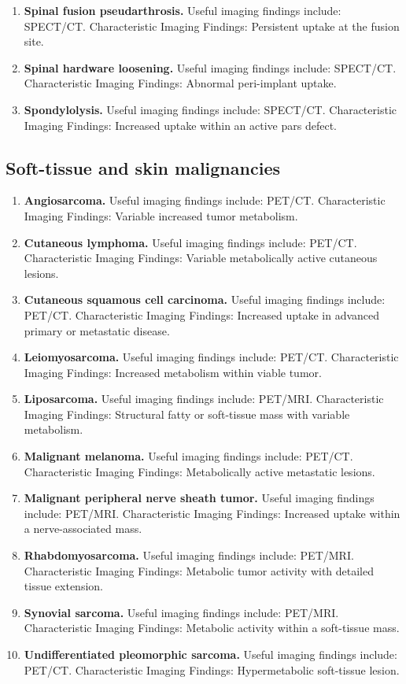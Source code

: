 \begin{enumerate}[leftmargin=*,itemsep=0.45em,topsep=0.4em]
\item \textbf{Spinal fusion pseudarthrosis.} Useful imaging findings include: SPECT/CT. Characteristic Imaging Findings: Persistent uptake at the fusion site.
\item \textbf{Spinal hardware loosening.} Useful imaging findings include: SPECT/CT. Characteristic Imaging Findings: Abnormal peri-implant uptake.
\item \textbf{Spondylolysis.} Useful imaging findings include: SPECT/CT. Characteristic Imaging Findings: Increased uptake within an active pars defect.
\end{enumerate}

\subsection{Soft-tissue and skin malignancies}
\begin{enumerate}[leftmargin=*,itemsep=0.45em,topsep=0.4em]
\item \textbf{Angiosarcoma.} Useful imaging findings include: PET/CT. Characteristic Imaging Findings: Variable increased tumor metabolism.
\item \textbf{Cutaneous lymphoma.} Useful imaging findings include: PET/CT. Characteristic Imaging Findings: Variable metabolically active cutaneous lesions.
\item \textbf{Cutaneous squamous cell carcinoma.} Useful imaging findings include: PET/CT. Characteristic Imaging Findings: Increased uptake in advanced primary or metastatic disease.
\item \textbf{Leiomyosarcoma.} Useful imaging findings include: PET/CT. Characteristic Imaging Findings: Increased metabolism within viable tumor.
\item \textbf{Liposarcoma.} Useful imaging findings include: PET/MRI. Characteristic Imaging Findings: Structural fatty or soft-tissue mass with variable metabolism.
\item \textbf{Malignant melanoma.} Useful imaging findings include: PET/CT. Characteristic Imaging Findings: Metabolically active metastatic lesions.
\item \textbf{Malignant peripheral nerve sheath tumor.} Useful imaging findings include: PET/MRI. Characteristic Imaging Findings: Increased uptake within a nerve-associated mass.
\item \textbf{Rhabdomyosarcoma.} Useful imaging findings include: PET/MRI. Characteristic Imaging Findings: Metabolic tumor activity with detailed tissue extension.
\item \textbf{Synovial sarcoma.} Useful imaging findings include: PET/MRI. Characteristic Imaging Findings: Metabolic activity within a soft-tissue mass.
\item \textbf{Undifferentiated pleomorphic sarcoma.} Useful imaging findings include: PET/CT. Characteristic Imaging Findings: Hypermetabolic soft-tissue lesion.
\end{enumerate}

